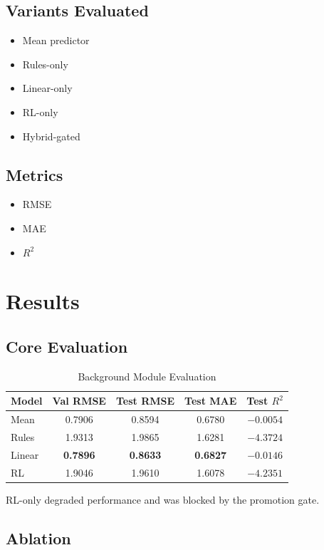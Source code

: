 \documentclass[conference]{IEEEtran}
\begin{document}
\subsection{Variants Evaluated}

\begin{itemize}
\item Mean predictor
\item Rules-only
\item Linear-only
\item RL-only
\item Hybrid-gated
\end{itemize}

\subsection{Metrics}

\begin{itemize}
\item RMSE
\item MAE
\item $R^2$
\end{itemize}

\section{Results}

\subsection{Core Evaluation}

\begin{table}[h]
\centering
\caption{Background Module Evaluation}
\begin{tabular}{lcccc}
\toprule
Model & Val RMSE & Test RMSE & Test MAE & Test $R^2$ \\
\midrule
Mean & 0.7906 & 0.8594 & 0.6780 & $-0.0054$ \\
Rules & 1.9313 & 1.9865 & 1.6281 & $-4.3724$ \\
Linear & \textbf{0.7896} & \textbf{0.8633} & \textbf{0.6827} & \textbf{$-0.0146$} \\
RL & 1.9046 & 1.9610 & 1.6078 & $-4.2351$ \\
\bottomrule
\end{tabular}
\end{table}

RL-only degraded performance and was blocked by the promotion gate.

\subsection{Ablation}
\end{document}
